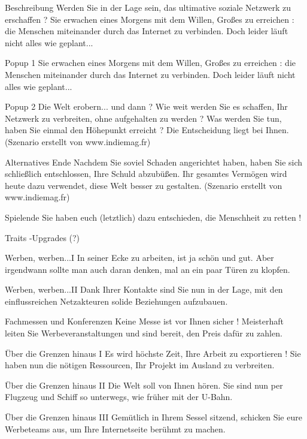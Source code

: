Beschreibung
Werden Sie in der Lage sein, das ultimative soziale Netzwerk zu erschaffen ?
Sie erwachen eines Morgens mit dem Willen, Großes zu erreichen : die Menschen miteinander durch das Internet zu verbinden. Doch leider läuft nicht alles wie geplant...


Popup 1
Sie erwachen eines Morgens mit dem Willen, Großes zu erreichen : die Menschen miteinander durch das Internet zu verbinden. Doch leider läuft nicht alles wie geplant...


Popup 2
Die Welt erobern... und dann ? Wie weit werden Sie es schaffen, Ihr Netzwerk zu verbreiten, ohne aufgehalten zu werden ? Was werden Sie tun, haben Sie einmal den Höhepunkt erreicht ? Die Entscheidung liegt bei Ihnen. (Szenario erstellt von www.indiemag.fr)


Alternatives Ende
Nachdem Sie soviel Schaden angerichtet haben, haben Sie sich schließlich entschlossen, Ihre Schuld abzubüßen. Ihr gesamtes Vermögen wird heute dazu verwendet, diese Welt besser zu gestalten. (Szenario erstellt von www.indiemag.fr)


Spielende
Sie haben euch (letztlich) dazu entschieden, die Menschheit zu retten !



Traits -Upgrades (?)  %



Werben, werben...I
In seiner Ecke zu arbeiten, ist ja schön und gut. Aber irgendwann sollte man auch daran denken, mal an ein paar Türen zu klopfen.

Werben, werben...II
Dank Ihrer Kontakte sind Sie nun in der Lage, mit den einflussreichen Netzakteuren solide Beziehungen aufzubauen.

Fachmessen und Konferenzen
Keine Messe ist vor Ihnen sicher ! Meisterhaft leiten Sie Werbeveranstaltungen und sind bereit, den Preis dafür zu zahlen.



Über die Grenzen hinaus I
Es wird höchste Zeit, Ihre Arbeit zu exportieren ! Sie haben nun die nötigen Ressourcen, Ihr Projekt im Ausland zu verbreiten.

Über die Grenzen hinaus II
Die Welt soll von Ihnen hören. Sie sind nun per Flugzeug und Schiff so unterwegs, wie früher mit der U-Bahn.

Über die Grenzen hinaus III
Gemütlich in Ihrem Sessel sitzend, schicken Sie eure Werbeteams aus, um Ihre Internetseite berühmt zu machen.



